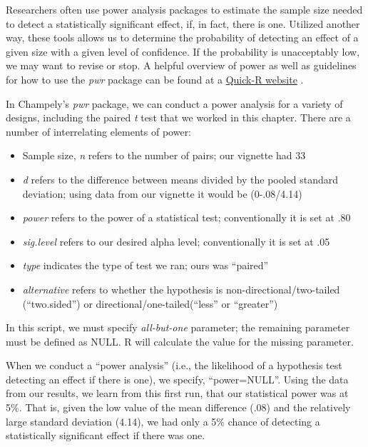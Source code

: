 \documentclass[
  11pt,
]{book}
\providecommand{\tightlist}{%
  \setlength{\itemsep}{0pt}\setlength{\parskip}{0pt}}
\begin{document}
Researchers often use power analysis packages to estimate the sample size needed to detect a statistically significant effect, if, in fact, there is one. Utilized another way, these tools allows us to determine the probability of detecting an effect of a given size with a given level of confidence. If the probability is unacceptably low, we may want to revise or stop. A helpful overview of power as well as guidelines for how to use the \emph{pwr} package can be found at a \href{https://www.statmethods.net/stats/power.html}{Quick-R website} \citep{kabacoff_power_2017}.

In Champely's \emph{pwr} package, we can conduct a power analysis for a variety of designs, including the paired \emph{t} test that we worked in this chapter. There are a number of interrelating elements of power:

\begin{itemize}
\tightlist
\item
  Sample size, \emph{n} refers to the number of pairs; our vignette had 33
\item
  \emph{d} refers to the difference between means divided by the pooled standard deviation; using data from our vignette it would be (0-.08/4.14)
\item
  \emph{power} refers to the power of a statistical test; conventionally it is set at .80
\item
  \emph{sig.level} refers to our desired alpha level; conventionally it is set at .05
\item
  \emph{type} indicates the type of test we ran; ours was ``paired''
\item
  \emph{alternative} refers to whether the hypothesis is non-directional/two-tailed (``two.sided'') or directional/one-tailed(``less'' or ``greater'')
\end{itemize}

In this script, we must specify \emph{all-but-one} parameter; the remaining parameter must be defined as NULL. R will calculate the value for the missing parameter.

When we conduct a ``power analysis'' (i.e., the likelihood of a hypothesis test detecting an effect if there is one), we specify, ``power=NULL''. Using the data from our results, we learn from this first run, that our statistical power was at 5\%. That is, given the low value of the mean difference (.08) and the relatively large standard deviation (4.14), we had only a 5\% chance of detecting a statistically significant effect if there was one.
\end{document}
